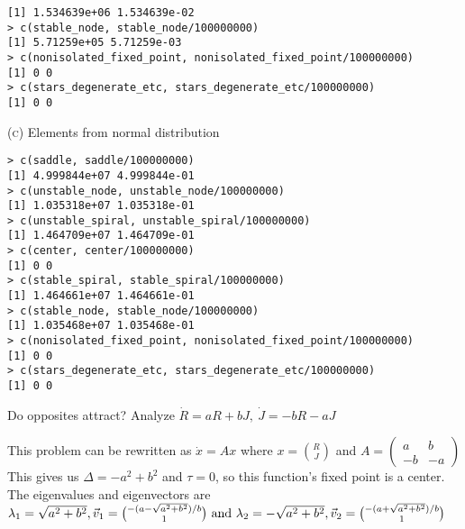 \documentclass[11pt,answers]{exam}
\begin{document}
\begin{questions}
\begin{solution}
\begin{verbatim}
[1] 1.534639e+06 1.534639e-02
> c(stable_node, stable_node/100000000)
[1] 5.71259e+05 5.71259e-03
> c(nonisolated_fixed_point, nonisolated_fixed_point/100000000)
[1] 0 0
> c(stars_degenerate_etc, stars_degenerate_etc/100000000)
[1] 0 0
\end{verbatim}
\textsc{(c)} Elements from normal distribution
\begin{verbatim}
> c(saddle, saddle/100000000)
[1] 4.999844e+07 4.999844e-01
> c(unstable_node, unstable_node/100000000)
[1] 1.035318e+07 1.035318e-01
> c(unstable_spiral, unstable_spiral/100000000)
[1] 1.464709e+07 1.464709e-01
> c(center, center/100000000)
[1] 0 0
> c(stable_spiral, stable_spiral/100000000)
[1] 1.464661e+07 1.464661e-01
> c(stable_node, stable_node/100000000)
[1] 1.035468e+07 1.035468e-01
> c(nonisolated_fixed_point, nonisolated_fixed_point/100000000)
[1] 0 0
> c(stars_degenerate_etc, stars_degenerate_etc/100000000)
[1] 0 0
\end{verbatim}
\end{solution}


\item Do opposites attract?  Analyze $\dot{R} = aR + bJ, \: \dot{J} = -bR -aJ$
\begin{solution}
This problem can be rewritten as $\dot{x} = Ax$ where $x = \binom{R}{J}$ and $\displaystyle A = \left(\begin{array}{cc} a & b \\ -b & -a \end{array}\right)$
This gives us $\Delta = -a^2 + b^2$ and $\tau = 0$, so this function's fixed point is a center.  The eigenvalues and eigenvectors are $\lambda_1 = \sqrt{a^2 + b^2}, \vec{v}_1 = \binom{-(a - \sqrt{a^2 + b^2})/b}{1} \hbox{ and } \lambda_2 = -\sqrt{a^2 + b^2}, \vec{v}_2 = \binom{-(a + \sqrt{a^2 + b^2})/b}{1}$
\end{solution}


\end{questions}
\end{document}
